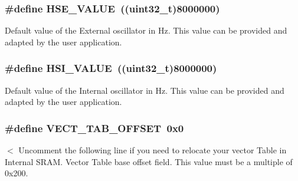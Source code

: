 \subsubsection[{H\+S\+E\+\_\+\+V\+A\+L\+U\+E}]{\setlength{\rightskip}{0pt plus 5cm}\#define H\+S\+E\+\_\+\+V\+A\+L\+U\+E~((uint32\+\_\+t)8000000)}\label{group___s_t_m32_f3xx___system___private___defines_gaeafcff4f57440c60e64812dddd13e7cb}
Default value of the External oscillator in Hz. This value can be provided and adapted by the user application. \hypertarget{group___s_t_m32_f3xx___system___private___defines_gaaa8c76e274d0f6dd2cefb5d0b17fbc37}{}
\subsubsection[{H\+S\+I\+\_\+\+V\+A\+L\+U\+E}]{\setlength{\rightskip}{0pt plus 5cm}\#define H\+S\+I\+\_\+\+V\+A\+L\+U\+E~((uint32\+\_\+t)8000000)}\label{group___s_t_m32_f3xx___system___private___defines_gaaa8c76e274d0f6dd2cefb5d0b17fbc37}
Default value of the Internal oscillator in Hz. This value can be provided and adapted by the user application. \hypertarget{group___s_t_m32_f3xx___system___private___defines_ga40e1495541cbb4acbe3f1819bd87a9fe}{}
\subsubsection[{V\+E\+C\+T\+\_\+\+T\+A\+B\+\_\+\+O\+F\+F\+S\+E\+T}]{\setlength{\rightskip}{0pt plus 5cm}\#define V\+E\+C\+T\+\_\+\+T\+A\+B\+\_\+\+O\+F\+F\+S\+E\+T~0x0}\label{group___s_t_m32_f3xx___system___private___defines_ga40e1495541cbb4acbe3f1819bd87a9fe}
$<$ Uncomment the following line if you need to relocate your vector Table in Internal S\+R\+A\+M. Vector Table base offset field. This value must be a multiple of 0x200. 